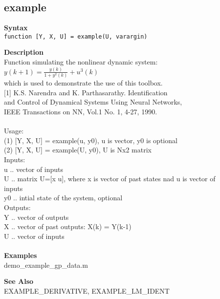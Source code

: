 \subsection*{example} \label{fun:example}

\textbf{Syntax}
\\  \texttt{function [Y, X, U] = example(U, varargin)}

\textbf{Description}
\\ Function simulating the nonlinear dynamic system:
\\   $ y(k+1) = \frac{y(k)}{1+y^2(k)} + u^3(k) $
\\ which is used to demonstrate the use of this toolbox.
\\ {[}1{]} K.S. Narendra and K. Parthasarathy. Identification
\\ and Control of Dynamical Systems Using Neural Networks,
\\ IEEE Transactions on NN, Vol.1 No. 1, 4-27, 1990.
\\
\\ Usage:
\\ (1) {[}Y, X, U{]} = example(u, y0), u is vector, y0 is optional
\\ (2) {[}Y, X, U{]} = example(U, y0), U is Nx2 matrix
\\ Inputs:
\\ u .. vector of inputs
\\ U .. matrix U=[x u], where x is vector of past states nad u is vector of
\\   inputs
\\ y0 .. intial state of the system, optional
\\ Outputs:
\\ Y .. vector of outputs
\\ X .. vector of past outputs: X(k) = Y(k-1)
\\ U .. vector of inputs
\\
\\

\textbf{Examples}
\\ demo\_example\_gp\_data.m

\textbf{See Also}
\\ EXAMPLE\_DERIVATIVE, EXAMPLE\_LM\_IDENT
